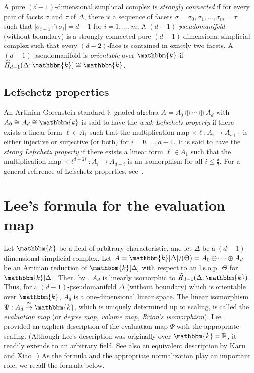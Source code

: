 A pure $(d-1)$-dimensional simplicial complex is \emph{strongly connected} if for every pair of facets $\sigma$ and $\tau$ of $\Delta$, there is a sequence of facets $\sigma=\sigma_0,\sigma_1,\ldots, \sigma_m=\tau$ such that $|\sigma_{i-1} \cap \sigma_i|=d-1$ for $i=1,\ldots,m$.
A \emph{$(d-1)$-pseudomanifold} (without boundary) is a strongly connected pure $(d-1)$-dimensional simplicial complex such that every $(d-2)$-face is contained in exactly two facets.
A $(d-1)$-pseudomanifold is \emph{orientable} over $\mathbbm{k}$ if $\widetilde{H}_{d-1}(\Delta;\mathbbm{k})\cong \mathbbm{k}$.


\subsection{Lefschetz properties}
An Artinian Gorenstein standard $\mathbb{N}$-graded algebra $A=A_0\oplus\cdots\oplus A_d$ with $A_0 \cong A_d \cong \mathbbm{k}$ is said to have the \emph{weak Lefschetz property} if there exists a linear form $\ell \in A_1$ such that the multiplication map $\times\ell:A_i \rightarrow A_{i+1}$ is either injective or surjective (or both) for $i=0,\ldots,d-1$.
It is said to have the \emph{strong Lefschetz property} if there exists a linear form $\ell \in A_1$ such that the multiplication map $\times\ell^{d-2i}:A_i \rightarrow A_{d-i}$ is an isomorphism for all $i \leq \frac{d}{2}$.
For a general reference of Lefschetz properties, see~\cite{HMMNWW}.

\section{Lee's formula for the evaluation map}
Let $\mathbbm{k}$ be a field of arbitrary characteristic, and let $\Delta$ be a $(d-1)$-dimensional simplicial complex.
Let $A=\mathbbm{k}[\Delta]/(\Theta)=A_0\oplus\cdots\oplus A_d$ be an Artinian reduction of $\mathbbm{k}[\Delta]$ with respect to an l.s.o.p.~$\Theta$ for $\mathbbm{k}[\Delta]$.
Then, by \cite[Corollary 3.2]{TW}, $A_d$ is linearly isomorphic to $\widetilde{H}_{d-1}(\Delta;\mathbbm{k})$.
Thus, for a $(d-1)$-pseudomanifold $\Delta$ (without boundary) which is orientable over $\mathbbm{k}$, $A_d$ is a one-dimensional linear space. 
The linear isomorphism $\Psi:A_d \overset{\cong}{\rightarrow} \mathbbm{k}$, which is uniquely determined up to scaling, is called the \emph{evaluation map} (or \emph{degree map, volume map, Brion's isomorphism}).
Lee~\cite{Lee} provided an explicit description of the evaluation map $\Psi$ with the appropriate scaling. (Although Lee's description was originally over $\mathbbm{k}=\mathbb{R}$, it readily extends to an arbitrary field. See also an equivalent description by Karu and Xiao~\cite{KX}.)
As the formula and the appropriate normalization play an important role, we recall the formula below.

